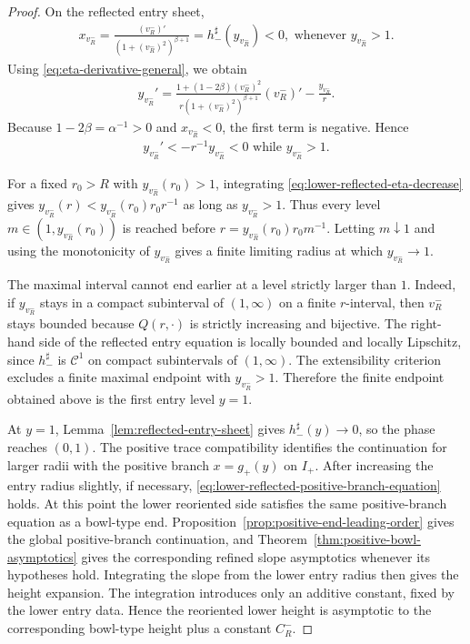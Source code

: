 \documentclass{amsart}
\theoremstyle{plain}
\theoremstyle{mainintrothm}
\theoremstyle{definition}
\begin{document}
\begin{proof}
	On the reflected entry sheet,
	\begin{align*}
		x_{v_R^-}=\frac{(v_R^-)'}{(1+(v_R^-)^2)^{\beta+1}}=h_-^\sharp(y_{v_R^-})<0,\mbox{ whenever }y_{v_R^-}>1.
	\end{align*}
	Using \eqref{eq:eta-derivative-general}, we obtain
	\begin{align*}
		y_{v_R^-}'
		=
		\frac{1+(1-2\beta)(v_R^-)^2}
		{r(1+(v_R^-)^2)^{\beta+1}}
		(v_R^-)'
		-
		\frac{y_{v_R^-}}{r}.
	\end{align*}
	Because $1-2\beta=\alpha^{-1}>0$ and $x_{v_R^-}<0$, the first term is
	negative.  Hence
	\begin{align}
		\label{eq:lower-reflected-eta-decrease}
		y_{v_R^-}'<-r^{-1}y_{v_R^-}<0
		\mbox{ while }y_{v_R^-}>1.
	\end{align}
	
	For a fixed $r_0>R$ with $y_{v_R^-}(r_0)>1$, integrating
	\eqref{eq:lower-reflected-eta-decrease} gives
	$y_{v_R^-}(r)<y_{v_R^-}(r_0)r_0r^{-1}$ as long as
	$y_{v_R^-}>1$.  Thus every level
	$m\in(1,y_{v_R^-}(r_0))$ is reached before
	$r=y_{v_R^-}(r_0)r_0m^{-1}$.  Letting $m\downarrow1$ and using the
	monotonicity of $y_{v_R^-}$ gives a finite limiting radius at which
	$y_{v_R^-}\to1$.
	
	\medskip
	
	The maximal interval cannot end earlier at a level strictly larger than $1$.
	Indeed, if $y_{v_R^-}$ stays in a compact subinterval of $(1,\infty)$ on a
	finite $r$-interval, then $v_R^-$ stays bounded because $Q(r,\cdot)$ is
	strictly increasing and bijective.  The right-hand side of the reflected entry
	equation is locally bounded and locally Lipschitz, since $h_-^\sharp$ is
	$\mathcal C^1$ on compact subintervals of $(1,\infty)$.  The extensibility
	criterion \cite[Corollary~2.15]{teschl2012ordinary} excludes a finite maximal
	endpoint with $y_{v_R^-}>1$.  Therefore the finite endpoint obtained above
	is the first entry level $y=1$.
	
	\medskip
	
	At $y=1$, Lemma~\ref{lem:reflected-entry-sheet} gives
	$h_-^\sharp(y)\to0$, so the phase reaches $(0,1)$.  The positive trace
	compatibility identifies the continuation for larger radii with the positive
	branch $x=g_+(y)$ on $I_+$.  After increasing the entry radius slightly, if
	necessary, \eqref{eq:lower-reflected-positive-branch-equation} holds. At this point the lower reoriented side satisfies the same positive-branch
	equation as a bowl-type end.  Proposition~\ref{prop:positive-end-leading-order}
	gives the global positive-branch continuation, and
	Theorem~\ref{thm:positive-bowl-asymptotics} gives the corresponding refined
	slope asymptotics whenever its hypotheses hold.  Integrating the slope from the
	lower entry radius then gives the height expansion.  The integration introduces
	only an additive constant, fixed by the lower entry data.  Hence the reoriented
	lower height is asymptotic to the corresponding bowl-type height plus a constant
	$C_R^-$.
\end{proof}
\end{document}
